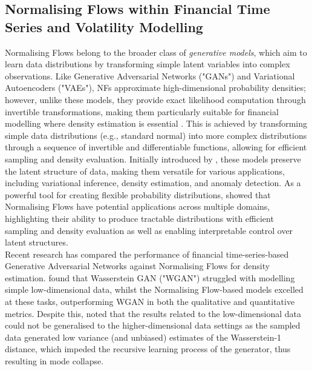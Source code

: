 \documentclass[oneside,12pt]{CUEDthesisPSnPDF}
\newcommand{\textcite}{\citet}
\newcommand{\parencite}{\citep}
\begin{document}

\subsection{Normalising Flows within Financial Time Series and Volatility Modelling}
\noindent 
Normalising Flows belong to the broader class of \textit{generative models}, which aim to learn data distributions by transforming simple latent variables into complex observations. Like Generative Adversarial Networks ("GANs") and Variational Autoencoders ("VAEs"), NFs approximate high-dimensional probability densities; however, unlike these models, they provide exact likelihood computation through invertible transformations, making them particularly suitable for financial modelling where density estimation is essential \parencite{rezende2015variational}. This is achieved by  transforming simple data distributions (e.g., standard normal) into more complex distributions through a sequence of invertible and differentiable functions, allowing for efficient sampling and density evaluation. Initially introduced by \textcite{rezende2015variational}, these models preserve the latent structure of data, making them versatile for various applications, including variational inference, density estimation, and anomaly detection. As a powerful tool for creating flexible probability distributions, \textcite{kobyzev2020normalising} showed that Normalising Flows have potential applications across multiple domains, highlighting their ability to produce tractable distributions with efficient sampling and density evaluation as well as enabling interpretable control over latent structures.\\

Recent research has compared the performance of financial time-series-based Generative Adversarial Networks against Normalising Flows for density estimation. \textcite{liu2020flows} found that Wasserstein GAN ("WGAN") struggled with modelling simple low-dimensional data, whilst the Normalising Flow-based models excelled at these tasks, outperforming WGAN in both the qualitative and quantitative metrics. Despite this, \textcite{liu2020flows} noted that the results related to the low-dimensional data could not be generalised to the higher-dimensional data settings as the sampled data generated low variance (and unbiased) estimates of the Wasserstein-1 distance, which impeded the recursive learning process of the generator, thus resulting in mode collapse.  \\
\end{document}
